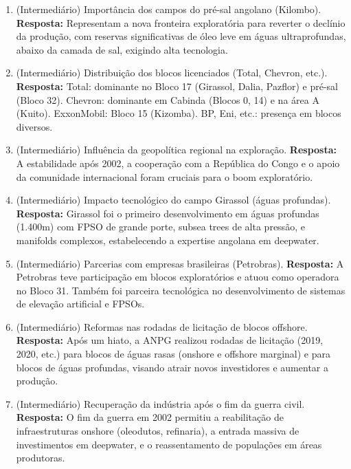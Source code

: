 \documentclass[11pt,a4paper]{article}
\begin{document}
\begin{enumerate}
  \item (Intermediário) Importância dos campos do pré-sal angolano (Kilombo).
  \textbf{Resposta:} Representam a nova fronteira exploratória para reverter o declínio da produção, com reservas significativas de óleo leve em águas ultraprofundas, abaixo da camada de sal, exigindo alta tecnologia.

  \item (Intermediário) Distribuição dos blocos licenciados (Total, Chevron, etc.).
  \textbf{Resposta:} Total: dominante no Bloco 17 (Girassol, Dalia, Pazflor) e pré-sal (Bloco 32). Chevron: dominante em Cabinda (Blocos 0, 14) e na área A (Kuito). ExxonMobil: Bloco 15 (Kizomba). BP, Eni, etc.: presença em blocos diversos.

  \item (Intermediário) Influência da geopolítica regional na exploração.
  \textbf{Resposta:} A estabilidade após 2002, a cooperação com a República do Congo e o apoio da comunidade internacional foram cruciais para o boom exploratório.

  \item (Intermediário) Impacto tecnológico do campo Girassol (águas profundas).
  \textbf{Resposta:} Girassol foi o primeiro desenvolvimento em águas profundas (1.400m) com FPSO de grande porte, subsea trees de alta pressão, e manifolds complexos, estabelecendo a expertise angolana em deepwater.

  \item (Intermediário) Parcerias com empresas brasileiras (Petrobras).
  \textbf{Resposta:} A Petrobras teve participação em blocos exploratórios e atuou como operadora no Bloco 31. Também foi parceira tecnológica no desenvolvimento de sistemas de elevação artificial e FPSOs.

  \item (Intermediário) Reformas nas rodadas de licitação de blocos offshore.
  \textbf{Resposta:} Após um hiato, a ANPG realizou rodadas de licitação (2019, 2020, etc.) para blocos de águas rasas (onshore e offshore marginal) e para blocos de águas profundas, visando atrair novos investidores e aumentar a produção.

  \item (Intermediário) Recuperação da indústria após o fim da guerra civil.
  \textbf{Resposta:} O fim da guerra em 2002 permitiu a reabilitação de infraestruturas onshore (oleodutos, refinaria), a entrada massiva de investimentos em deepwater, e o reassentamento de populações em áreas produtoras.


\end{enumerate}
\end{document}
